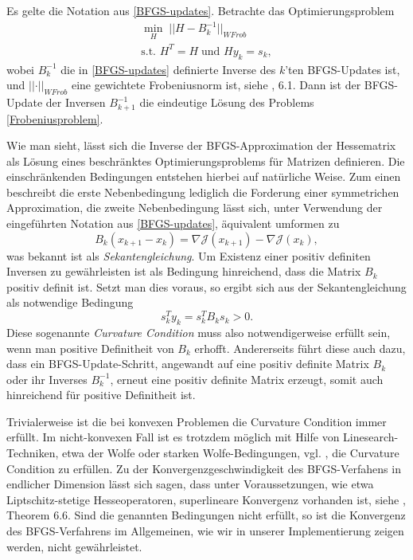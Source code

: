 \begin{theorem}
		
	Es gelte die Notation aus \ref{BFGS-updates}. Betrachte das Optimierungsproblem
	\begin{equation}\label{Frobeniusproblem}
	\begin{aligned}
		\underset{H}{\min}\; \vert\vert H - B_k^{-1} \vert\vert _{WFrob} \\
		\text{s.t. } H^T = H\; \text{und } H y_k = s_k,
	\end{aligned}
	\end{equation}
	wobei $B_k^{-1}$ die in \ref{BFGS-updates} definierte Inverse des $k$'ten BFGS-Updates ist, und \newline
$\vert\vert \cdot \vert\vert_{WFrob}$ 
eine gewichtete Frobeniusnorm ist, siehe \cite{Nocedal}, 6.1. Dann ist der BFGS-Update der Inversen $B_{k+1}^{-1}$ die eindeutige Lösung des Problems \ref{Frobeniusproblem}.
\end{theorem}
Wie man sieht, lässt sich die Inverse der BFGS-Approximation der Hessematrix als Lösung eines beschränktes Optimierungsproblems für Matrizen definieren. Die einschränkenden Bedingungen entstehen hierbei auf natürliche Weise. Zum einen beschreibt die erste Nebenbedingung lediglich die Forderung einer symmetrichen Approximation, die zweite Nebenbedingung lässt sich, unter Verwendung der eingeführten Notation aus \ref{BFGS-updates}, äquivalent umformen zu
\begin{equation}
	B_k (x_{k+1} - x_k) = \nabla \mathcal{J}(x_{k+1}) - \nabla \mathcal{J}(x_k),
\end{equation}
was bekannt ist als \textit{Sekantengleichung}. Um Existenz einer positiv definiten Inversen zu gewährleisten ist als Bedingung hinreichend, dass die Matrix $B_k$ positiv definit ist. Setzt man dies voraus, so ergibt sich aus der Sekantengleichung als notwendige Bedingung
\begin{equation}
	s_k^T y_k = s_k^T B_k s_k > 0.
\end{equation}
Diese sogenannte \textit{Curvature Condition} muss also notwendigerweise erfüllt sein, wenn man positive Definitheit von $B_k$ erhofft. Andererseits führt diese auch dazu, dass ein BFGS-Update-Schritt, angewandt auf eine positiv definite Matrix $B_k$ oder ihr Inverses $B_k^{-1}$, erneut eine positiv definite Matrix erzeugt, somit auch hinreichend für positive Definitheit ist. 

Trivialerweise ist die bei konvexen Problemen die Curvature Condition immer erfüllt. Im nicht-konvexen Fall ist es trotzdem möglich mit Hilfe von Linesearch-Techniken, etwa der Wolfe oder starken Wolfe-Bedingungen, vgl. \cite{Nocedal}, die Curvature Condition zu erfüllen. Zu der Konvergenzgeschwindigkeit des BFGS-Verfahens in endlicher Dimension lässt sich sagen, dass unter Voraussetzungen, wie etwa Liptschitz-stetige Hesseoperatoren, superlineare Konvergenz vorhanden ist, siehe \cite{Nocedal}, Theorem 6.6. Sind die genannten Bedingungen nicht erfüllt, so ist die Konvergenz des BFGS-Verfahrens im Allgemeinen, wie wir in unserer Implementierung zeigen werden, nicht gewährleistet.

